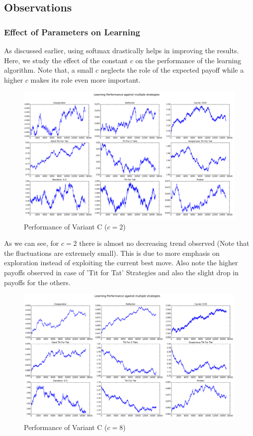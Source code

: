 \documentclass[a4paper]{article}
\begin{document}
	\subsection{Observations}
	
	\subsubsection{Effect of Parameters on Learning}

	As discussed earlier, using softmax drastically helps in improving the results. Here, we study the effect of the constant $c$ on the performance of the learning algorithm. Note that, a small $c$ neglects the role of the expected payoff while a higher $c$ makes its role even more important.

	\begin{figure}[H]
	\centering
	\includegraphics[width=\textwidth]{learnerInitialC_b2.png}
	\caption*{{Performance of Variant C ($c = 2$)}}
	\end{figure}
	
	As we can see, for $c=2$ there is almost no decreasing trend observed (Note that the fluctuations are extremely small). This is due to more emphasis on exploration instead of exploiting the current best move. Also note the higher payoffs observed in case of 'Tit for Tat' Strategies and also the slight drop in payoffs for the others.

	\begin{figure}[H]
	\centering
	\includegraphics[width=\textwidth]{learnerInitialC_b8.png}
	\caption*{{Performance of Variant C ($c = 8$)}}
	\end{figure}
\end{document}
